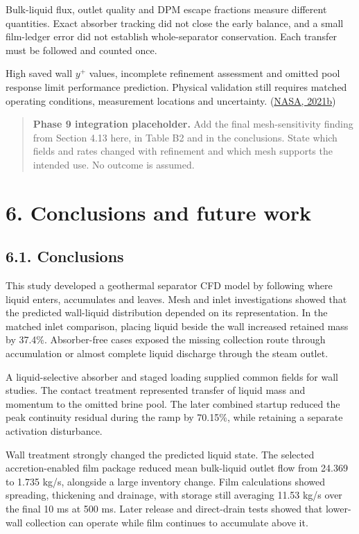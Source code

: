 \documentclass[
  12pt,
  a4paper,
]{article}
\begin{document}
Bulk-liquid flux, outlet quality and DPM escape fractions measure
different quantities. Exact absorber tracking did not close the early
balance, and a small film-ledger error did not establish whole-separator
conservation. Each transfer must be followed and counted once.

High saved wall \(y^+\) values, incomplete refinement assessment and
omitted pool response limit performance prediction. Physical validation
still requires matched operating conditions, measurement locations and
uncertainty.
(\href{https://www.grc.nasa.gov/www/wind/valid/tutorial/valassess.html}{NASA,
2021b})

\begin{quote}
\textbf{Phase 9 integration placeholder.} Add the final mesh-sensitivity
finding from Section 4.13 here, in Table B2 and in the conclusions.
State which fields and rates changed with refinement and which mesh
supports the intended use. No outcome is assumed.
\end{quote}

\section{6. Conclusions and future
work}\label{conclusions-and-future-work}

\subsection{6.1. Conclusions}\label{conclusions}

This study developed a geothermal separator CFD model by following where
liquid enters, accumulates and leaves. Mesh and inlet investigations
showed that the predicted wall-liquid distribution depended on its
representation. In the matched inlet comparison, placing liquid beside
the wall increased retained mass by 37.4\%. Absorber-free cases exposed
the missing collection route through accumulation or almost complete
liquid discharge through the steam outlet.

A liquid-selective absorber and staged loading supplied common fields
for wall studies. The contact treatment represented transfer of liquid
mass and momentum to the omitted brine pool. The later combined startup
reduced the peak continuity residual during the ramp by 70.15\%, while
retaining a separate activation disturbance.

Wall treatment strongly changed the predicted liquid state. The selected
accretion-enabled film package reduced mean bulk-liquid outlet flow from
24.369 to 1.735 kg/s, alongside a large inventory change. Film
calculations showed spreading, thickening and drainage, with storage
still averaging 11.53 kg/s over the final 10 ms at 500 ms. Later release
and direct-drain tests showed that lower-wall collection can operate
while film continues to accumulate above it.
\end{document}
